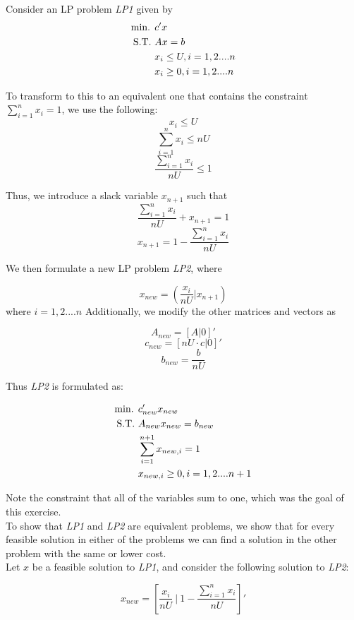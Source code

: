 Consider an LP problem \textit{LP1} given by
\begin{align}
    \text{min. } &c'x \notag\\
    \text{S.T. } &Ax = b \notag\\
    &x_i \le U, i = 1,2....n \notag\\
    &x_i \ge 0, i = 1,2....n \notag\\
\end{align}

To transform to this to an equivalent one that contains the constraint $\sum_{i=1}^{n}x_i = 1$, we use the following: 
\[ x_i \le U\]
\[ \sum_{i=1}^{n}x_i \le nU \]
\[ \frac{\sum_{i=1}^{n}x_i}{nU} \le 1\]

Thus, we introduce a slack variable $x_{n+1}$ such that
\[ \frac{\sum_{i=1}^{n}x_i}{nU} + x_{n+1} = 1\]
\[ x_{n+1}=1-\frac{\sum_{i=1}^{n}x_i}{nU}\]

We then formulate a new LP problem \textit{LP2}, where

\[ x_{new} = (\frac{x_i}{nU} | x_{n+1})\]
where $i=1,2....n$
Additionally, we modify the other matrices and vectors as 

\[ A_{new} = [A | 0]'\]
\[ c_{new} = [nU\cdot c | 0]'\]
\[ b_{new} = \frac{b}{nU}\]

Thus \textit{LP2} is formulated as:


\begin{align}
    \text{min. } &c_{new}'x_{new} \notag\\
    \text{S.T. } &A_{new}x_{new} = b_{new} \notag\\
    &\sum_{i=1}^{n+1}x_{new,i} = 1 \notag \\
    &x_{new,i} \ge 0, i = 1,2....n+1 \notag\\
\end{align}

Note the constraint that all of the variables sum to one, which was the goal of this exercise.\\

To show that \textit{LP1} and \textit{LP2} are equivalent problems, we show that for every feasible solution in either of the problems we can find a solution in the other problem with the same or lower cost.\\

Let $x$ be a feasible solution to \textit{LP1}, and consider the following solution to \textit{LP2}:

\[x_{new} = \left[\frac{x_i}{nU} \:|\: 1 - \frac{\sum_{i=1}^{n}x_i}{nU}\right]'\]

